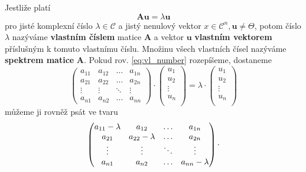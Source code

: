 {\begin{definition}
        Jestliže platí
        \begin{equation}\label{eq:vl_number}
          \mathbf{Au} = \lambda\mathbf{u}
        \end{equation}
        pro jisté komplexní číslo \(\lambda\in\mathcal{C}\)  a jistý nenulový vektor 
        \(x\in\mathcal{C}^n, \mathbf{u}\neq\Theta\), potom číslo \(\lambda\) nazýváme 
        \textbf{vlastním číslem} matice \(\mathbf{A}\) a vektor \(\mathbf{u}\) \textbf{vlastním 
        vektorem} příslušným k tomuto vlastnímu číslu. Množinu všech vlastních čísel nazýváme 
        \textbf{spektrem matice} \(\mathbf{A}\). Pokud rov. \ref{eq:vl_number} rozepíšeme, dostaneme
        \begin{equation}
          \begin{pmatrix}
            a_{11} & a_{12} & \ldots & a_{1n} \\
            a_{21} & a_{22} & \ldots & a_{2n} \\
            \vdots & \vdots & \ddots & \vdots \\
            a_{n1} & a_{n2} & \ldots & a_{nn}
          \end{pmatrix}   \cdot
          \begin{pmatrix}
            u_{1} \\  u_{2} \\ \vdots \\  u_{n} \\
          \end{pmatrix}    =\lambda\cdot
          \begin{pmatrix}
            u_{1} \\ u_{2} \\ \vdots \\ u_{n} \\
          \end{pmatrix}
        \end{equation}
        můžeme ji rovněž psát ve tvaru
        \begin{equation*}
            \begin{pmatrix}
            \setlength{\arraycolsep}{3pt}
              a_{11} -\lambda & a_{12}           & \ldots & a_{1n} \\
              a_{21}          & a_{22} -\lambda  & \ldots & a_{2n} \\
              \vdots          & \vdots           & \ddots & \vdots \\
              a_{n1}          & a_{n2}           & \ldots & a_{nn}-\lambda
            \end{pmatrix} \cdot

\end{equation*}
\end{definition}}

